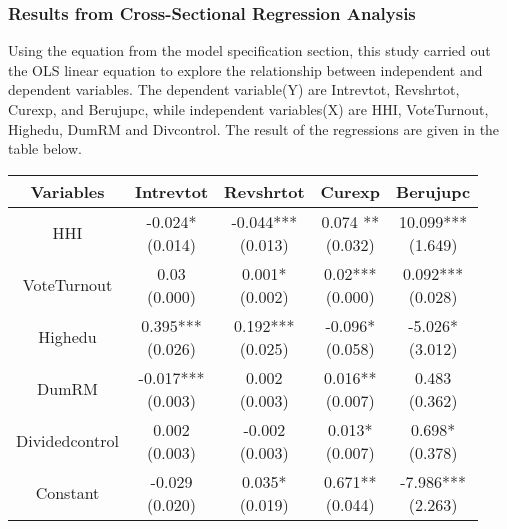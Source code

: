\subsubsection{Results from Cross-Sectional Regression Analysis}
Using the equation from the model specification section, this study carried out the OLS linear equation to explore the relationship between independent and dependent variables. The dependent variable(Y) are Intrevtot, Revshrtot, Curexp, and Berujupc, while independent variables(X) are HHI, VoteTurnout, Highedu, DumRM and Divcontrol. The result of the regressions are given in the table below.\\
\begin{table}[ht]
\centering
\begin{tabular}{|ccccc|}
\hline
\textbf{Variables} & \textbf{Intrevtot} & \textbf{Revshrtot} & \textbf{Curexp} & \textbf{Berujupc} \\
\hline
HHI & \makecell{-0.024* \\ (0.014)} & \makecell{-0.044*** \\ (0.013)} & \makecell{0.074 **\\ (0.032)} & \makecell{10.099*** \\ (1.649)} \\

VoteTurnout& \makecell{0.03 \\ (0.000)} & \makecell{0.001* \\ (0.002)} & \makecell{0.02***\\ (0.000)} & \makecell{0.092*** \\ (0.028)} \\

Highedu & \makecell{0.395*** \\ (0.026)} & \makecell{0.192*** \\ (0.025)} & \makecell{-0.096* \\ (0.058)} & \makecell{-5.026* \\ (3.012)} \\
DumRM & \makecell{-0.017*** \\ (0.003)} & \makecell{0.002\\ (0.003)} & \makecell{0.016**\\ (0.007)} & \makecell{0.483 \\ (0.362)} \\
Dividedcontrol & \makecell{0.002 \\ (0.003)} & \makecell{-0.002\\ (0.003)} & \makecell{0.013*\\ (0.007)} & \makecell{0.698*\\ (0.378)} \\
Constant & \makecell{-0.029 \\ (0.020)} & \makecell{0.035* \\ (0.019)} & \makecell{0.671** \\ (0.044)} & \makecell{-7.986*** \\ (2.263)} \\\hline


\end{tabular}
\end{table}

